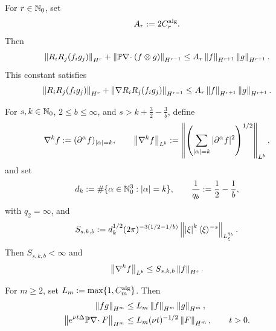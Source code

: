\begin{lemma}
\label{lem:qc-analytic-constants}
For \(r\in\mathbb N_0\), set
\[
 A_r:=2C_r^{\rm alg}.
\]
Then
\begin{equation}
 \left\lVert R_iR_j(f_i g_j)\right\rVert_{H^r}
 +\left\lVert \mathbb P\nabla\!\cdot(f\otimes g)\right\rVert_{H^{r-1}}
 \le A_r\left\lVert f\right\rVert_{H^{r+1}}\left\lVert g\right\rVert_{H^{r+1}}.
 \label{eq:qc-product-constant}
\end{equation}
This constant satisfies
\begin{equation}
 \left\lVert R_iR_j(f_i g_j)\right\rVert_{H^r}
 +\left\lVert \nabla R_iR_j(f_i g_j)\right\rVert_{H^{r-1}}
 \le A_r\left\lVert f\right\rVert_{H^{r+1}}\left\lVert g\right\rVert_{H^{r+1}}.
 \label{eq:qc-pressure-product-constant}
\end{equation}
\begin{samepage}
For \(s,k\in\mathbb N_0\), \(2\le b\le\infty\), and
\(s>k+\frac32-\frac3b\), define
\[
 \nabla^k f:=(\partial^\alpha f)_{|\alpha|=k},
 \qquad
 \left\lVert \nabla^k f\right\rVert_{L^b}
 :=\left\|\left(
   \sum_{|\alpha|=k}|\partial^\alpha f|^2
 \right)^{1/2}\right\|_{L^b},
\]
and set
\[
 d_k:=\#\{\alpha\in\mathbb N_0^3:\left|\alpha\right|=k\},
 \qquad
 \frac1{q_b}:=\frac12-\frac1b,
\]
with \(q_2=\infty\), and
\begin{equation}
 S_{s,k,b}:=
 d_k^{1/2}(2\pi)^{-3(1/2-1/b)}
 \left\lVert \left|\xi\right|^k\langle\xi\rangle^{-s}\right\rVert_{L^{q_b}_\xi}.
 \label{eq:qc-embedding-constant-definition}
\end{equation}
Then \(S_{s,k,b}<\infty\) and
\begin{equation}
 \left\lVert \nabla^k f\right\rVert_{L^b}\le S_{s,k,b}\left\lVert f\right\rVert_{H^s}.
 \label{eq:qc-embedding-constant}
\end{equation}
\par
\end{samepage}
For \(m\ge2\), set \(L_m:=\max\{1,C_m^{\rm alg}\}\).  Then
\begin{align}
 \left\lVert fg\right\rVert_{H^m}
 &\le L_m\left\lVert f\right\rVert_{H^m}\left\lVert g\right\rVert_{H^m},
 \label{eq:qc-algebra-constant}\\
 \left\lVert e^{\nu t\Delta}\mathbb P\nabla\!\cdot F\right\rVert_{H^m}
 &\le L_m(\nu t)^{-1/2}\left\lVert F\right\rVert_{H^m},
 \qquad t>0.
 \label{eq:qc-heat-constant}
\end{align}
\end{lemma}

